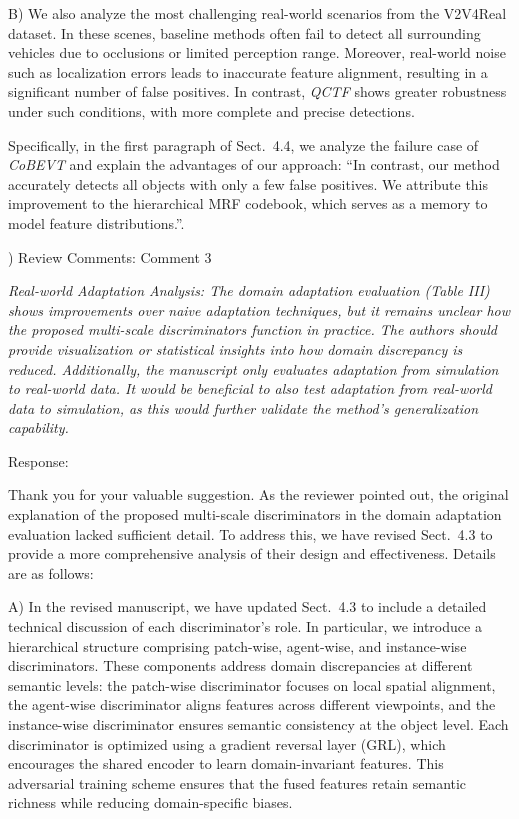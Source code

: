 \documentclass[12pt,a4paper]{article}
\begin{document}
B) We also analyze the most challenging real-world scenarios from the V2V4Real dataset.
In these scenes, baseline methods often fail to detect all surrounding vehicles due to occlusions or limited perception range. Moreover, real-world noise such as localization errors leads to inaccurate feature alignment, resulting in a significant number of false positives. In contrast, \emph{QCTF} shows greater robustness under such conditions, with more complete and precise detections.

Specifically, in the first paragraph of Sect.~4.4, we analyze the failure case of \emph{CoBEVT} and explain the advantages of our approach: ``In contrast, our method accurately detects all objects with only a few false positives. We attribute this improvement to the hierarchical MRF codebook, which serves as a memory to model feature distributions.''.

\vspace{4ex}
) Review Comments: Comment 3

\textit{Real-world Adaptation Analysis: The domain adaptation evaluation (Table III) shows improvements over naive adaptation techniques, but it remains unclear how the proposed multi-scale discriminators function in practice. The authors should provide visualization or statistical insights into how domain discrepancy is reduced. Additionally, the manuscript only evaluates adaptation from simulation to real-world data. It would be beneficial to also test adaptation from real-world data to simulation, as this would further validate the method's generalization capability.}

\noindent Response:

Thank you for your valuable suggestion. As the reviewer pointed out, the original explanation of the proposed multi-scale discriminators in the domain adaptation evaluation lacked sufficient detail. To address this, we have revised Sect.~4.3 to provide a more comprehensive analysis of their design and effectiveness.
Details are as follows:

A) In the revised manuscript, we have updated Sect.~4.3 to include a detailed technical discussion of each discriminator's role. In particular, we introduce a hierarchical structure comprising patch-wise, agent-wise, and instance-wise discriminators. These components address domain discrepancies at different semantic levels: the patch-wise discriminator focuses on local spatial alignment, the agent-wise discriminator aligns features across different viewpoints, and the instance-wise discriminator ensures semantic consistency at the object level. 
Each discriminator is optimized using a gradient reversal layer (GRL), which encourages the shared encoder to learn domain-invariant features. This adversarial training scheme ensures that the fused features retain semantic richness while reducing domain-specific biases.
\end{document}
